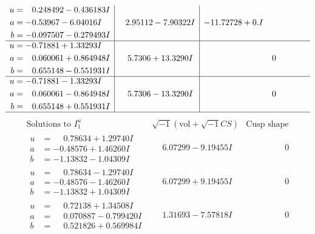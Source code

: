 \documentclass[1p]{elsarticle_modified}
\theoremstyle{definition}
\newcommand{\I}{\sqrt{-1}}
\begin{document}
$$\begin{array}{c|c|c}
\begin{aligned}
u &= \phantom{-}0.248492 - 0.436183 I \\
a &= -0.53967 - 6.04016 I \\
b &= -0.097507 - 0.279493 I\end{aligned}
 & \phantom{-}2.95112 - 7.90322 I & -11.72728 + 0. I\phantom{ +0.000000I} \\ \hline\begin{aligned}
u &= -0.71881 + 1.33293 I \\
a &= \phantom{-}0.060061 + 0.864948 I \\
b &= \phantom{-}0.655148 - 0.551931 I\end{aligned}
 & \phantom{-}5.7306 + 13.3290 I & \phantom{-0.000000 } 0 \\ \hline\begin{aligned}
u &= -0.71881 - 1.33293 I \\
a &= \phantom{-}0.060061 - 0.864948 I \\
b &= \phantom{-}0.655148 + 0.551931 I\end{aligned}
 & \phantom{-}5.7306 - 13.3290 I & \phantom{-0.000000 } 0\\
 \hline 
 \end{array}$$\newpage$$\begin{array}{c|c|c}  
\text{Solutions to }I^u_{1}& \I (\text{vol} + \sqrt{-1}CS) & \text{Cusp shape}\\
 \hline 
\begin{aligned}
u &= \phantom{-}0.78634 + 1.29740 I \\
a &= -0.48576 + 1.46260 I \\
b &= -1.13832 - 1.04309 I\end{aligned}
 & \phantom{-}6.07299 - 9.19455 I & \phantom{-0.000000 } 0 \\ \hline\begin{aligned}
u &= \phantom{-}0.78634 - 1.29740 I \\
a &= -0.48576 - 1.46260 I \\
b &= -1.13832 + 1.04309 I\end{aligned}
 & \phantom{-}6.07299 + 9.19455 I & \phantom{-0.000000 } 0 \\ \hline\begin{aligned}
u &= \phantom{-}0.72138 + 1.34508 I \\
a &= \phantom{-}0.070887 - 0.799420 I \\
b &= \phantom{-}0.521826 + 0.569984 I\end{aligned}
 & \phantom{-}1.31693 - 7.57818 I & \phantom{-0.000000 } 0 \\ \hline\begin{aligned}

\end{aligned}
\end{array}$$
\end{document}

